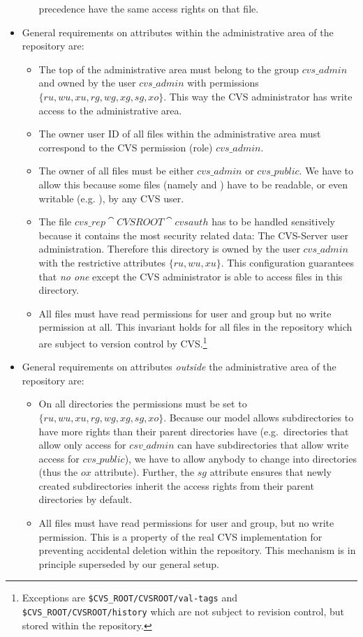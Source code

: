 \begin{itemize}
\begin{itemize}
    precedence have the same access rights on that file.
  \end{itemize}
\item General requirements on attributes within the administrative area of the
  repository are:
  \begin{itemize}
  \item The top of the administrative area must belong to the group $cvs\_admin$ and
    owned by the user $cvs\_admin$ with permissions $\{ru,wu,xu,rg,wg,xg,sg,xo\}$.  This way
    the CVS administrator has write access to the administrative area.
  \item The owner user ID of all files within the administrative area must
    correspond to the CVS permission (role) $cvs\_admin$.
  \item The owner of all files must be either $cvs\_admin$ or
    $cvs\_public$. We have to allow this because some files (namely
     and ) have to be readable, or even
    writable (e.g. ), by any CVS user.
  \item The file $cvs\_rep \cat CVSROOT \cat cvsauth$ has to be handled
    sensitively because it contains the most security related data: The
    CVS-Server user administration. Therefore this directory is owned by the
    user $cvs\_admin$ with the restrictive attributes $\{ru, wu, xu\}$.  This
    configuration guarantees that \emph{no one} except the CVS administrator is
    able to access files in this directory.
  \item All files must have read permissions for user and group but no write
    permission at all.  This invariant holds for all files in the repository
    which are subject to version control by CVS.\footnote{Exceptions are
      \texttt{\$CVS\_ROOT/CVSROOT/val-tags} and
      \texttt{\$CVS\_ROOT/CVSROOT/history} which are not subject to revision
      control, but stored within the repository.}
  \end{itemize}
\item General requirements on attributes \emph{outside} the administrative area
  of the repository are:
  \begin{itemize}
  \item On all directories the permissions must be set to
    $\{ru,wu,xu,rg,wg,xg,sg,xo\}$.  Because our model allows subdirectories to
    have more rights than their parent directories have (e.g.\ directories that
    allow only access for $csv\_admin$ can have subdirectories that allow write
    access for $cvs\_public$), we have to allow anybody to change into
    directories (thus the $ox$ attribute). Further, the $sg$ attribute ensures
    that newly created subdirectories inherit the access rights from their
    parent directories by default.
  \item All files must have read permissions for user and group, but no write
    permission.  This is a property of the real CVS implementation for
    preventing accidental deletion within the repository. This mechanism is in
    principle superseded by our general setup.
  \end{itemize}
\end{itemize}

